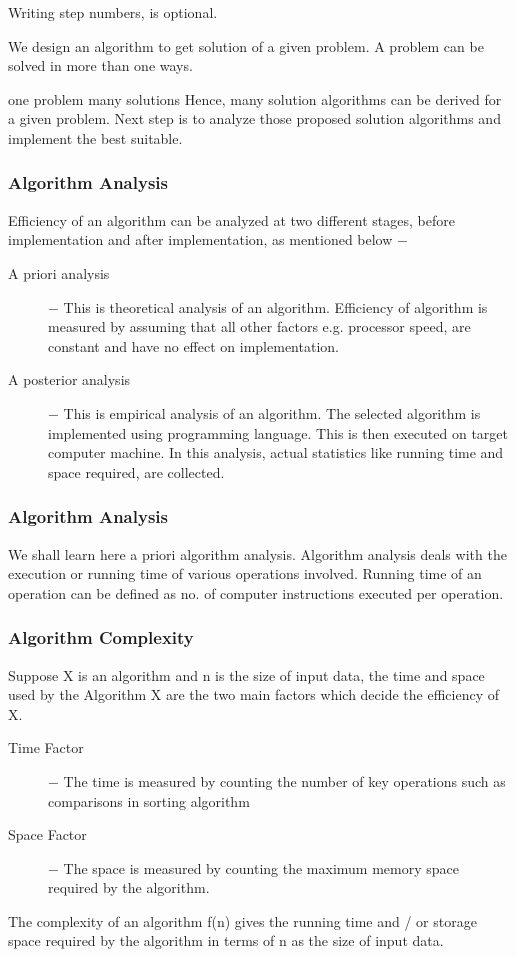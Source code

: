 \documentclass{beamer}
\begin{document}
\begin{frame}
Writing step numbers, is optional.

We design an algorithm to get solution of a given problem. A problem can be solved in more than one ways.

one problem many solutions
Hence, many solution algorithms can be derived for a given problem. Next step is to analyze those proposed solution algorithms and implement the best suitable.
\end{frame}
\begin{frame}
\frametitle{Algorithm Analysis}
Efficiency of an algorithm can be analyzed at two different stages, before implementation and after implementation, as mentioned below −
\begin{description}
\item[A priori analysis] − This is theoretical analysis of an algorithm. Efficiency of algorithm is measured by assuming that all other factors e.g. processor speed, are constant and have no effect on implementation.

\item[A posterior analysis] − This is empirical analysis of an algorithm. The selected algorithm is implemented using programming language. This is then executed on target computer machine. In this analysis, actual statistics like running time and space required, are collected.
\end{description}
\end{frame}
\begin{frame}
	\frametitle{Algorithm Analysis}
We shall learn here a priori algorithm analysis. Algorithm analysis deals with the execution or running time of various operations involved. Running time of an operation can be defined as no. of computer instructions executed per operation.
\end{frame}
\begin{frame}
\frametitle{Algorithm Complexity}
Suppose X is an algorithm and n is the size of input data, the time and space used by the Algorithm X are the two main factors which decide the efficiency of X.
\begin{description}
\item[Time Factor] − The time is measured by counting the number of key operations such as comparisons in sorting algorithm

\item[Space Factor] − The space is measured by counting the maximum memory space required by the algorithm.
\end{description}
The complexity of an algorithm f(n) gives the running time and / or storage space required by the algorithm in terms of n as the size of input data.
\end{frame}
\end{document}
